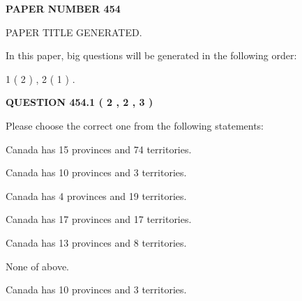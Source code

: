 \documentclass[12pt]{article}
\begin{document}
   
   
   
\newpage 
\setcounter{page}{ 
   454001 } 
   
   
   
   
 {\textbf{ \Large{ PAPER NUMBER  454  }}}
   
   
\vspace{0.2in}
   
   
   
   
   
   
   
   
 \vspace{0.2in}
 
 
 
 
   
   
 PAPER TITLE GENERATED.
   
   
   
\vspace{0.2in}
   
In this paper, big questions will be generated in the following order: 
   
   
   1 ( 2 )
 ,
   2 ( 1 )
 .
  
\vspace{0.2in}
  
{\textbf{\Large{QUESTION
454.1 
 ( 2 , 2 , 3 )
}}}
  
  
Please choose the correct one from the following statements:
 
 
Canada has  15 provinces and  74 territories.
 
 
Canada has 10  provinces and 3 territories.
 
 
Canada has   4 provinces and  19 territories.
 
 
Canada has  17 provinces and  17 territories.
 
 
Canada has  13 provinces and  8 territories.
 
 
 None of above.
 
 
\noindent{}
 
 
Canada has 10  provinces and 3 territories.
 
 
\noindent{}
 
\end{document}
